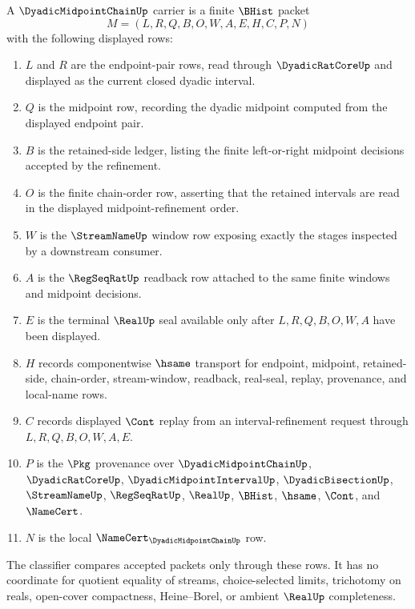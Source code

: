\begin{definition}
\label{def:dyadic-midpoint-chain-carrier}
A $\DyadicMidpointChainUp$ carrier is a finite $\BHist$ packet
$$
M=(L,R,Q,B,O,W,A,E,H,C,P,N)
$$
with the following displayed rows:
\begin{enumerate}
\item $L$ and $R$ are the endpoint-pair rows, read through $\DyadicRatCoreUp$ and displayed as the current closed dyadic interval.
\item $Q$ is the midpoint row, recording the dyadic midpoint computed from the displayed endpoint pair.
\item $B$ is the retained-side ledger, listing the finite left-or-right midpoint decisions accepted by the refinement.
\item $O$ is the finite chain-order row, asserting that the retained intervals are read in the displayed midpoint-refinement order.
\item $W$ is the $\StreamNameUp$ window row exposing exactly the stages inspected by a downstream consumer.
\item $A$ is the $\RegSeqRatUp$ readback row attached to the same finite windows and midpoint decisions.
\item $E$ is the terminal $\RealUp$ seal available only after $L,R,Q,B,O,W,A$ have been displayed.
\item $H$ records componentwise $\hsame$ transport for endpoint, midpoint, retained-side, chain-order, stream-window, readback, real-seal, replay, provenance, and local-name rows.
\item $C$ records displayed $\Cont$ replay from an interval-refinement request through $L,R,Q,B,O,W,A,E$.
\item $P$ is the $\Pkg$ provenance over $\DyadicMidpointChainUp$, $\DyadicRatCoreUp$, $\DyadicMidpointIntervalUp$, $\DyadicBisectionUp$, $\StreamNameUp$, $\RegSeqRatUp$, $\RealUp$, $\BHist$, $\hsame$, $\Cont$, and $\NameCert$.
\item $N$ is the local $\NameCert_{\DyadicMidpointChainUp}$ row.
\end{enumerate}
The classifier compares accepted packets only through these rows. It has no coordinate for quotient equality of streams, choice-selected limits, trichotomy on reals, open-cover compactness, Heine--Borel, or ambient $\RealUp$ completeness.
\end{definition}

